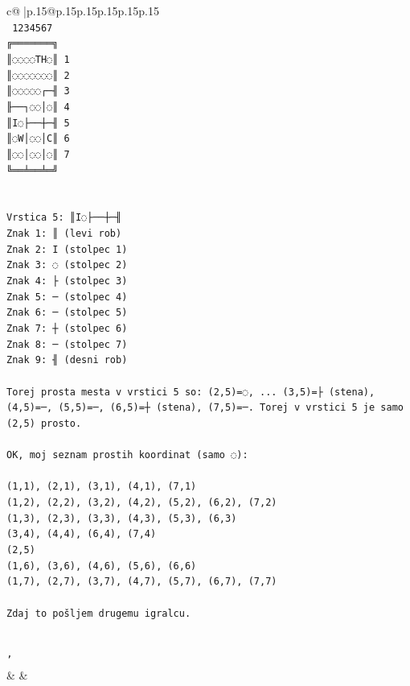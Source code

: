 \documentclass{article}
\begin{document}
{\begin{supertabular}{c@{$\;$}|p{.15\linewidth}@{}p{.15\linewidth}p{.15\linewidth}p{.15\linewidth}p{.15\linewidth}p{.15\linewidth}}
{{{\\ 
\texttt{ 1234567} \\
\texttt{╔═══════╗} \\
\texttt{║◌◌◌◌TH◌║ 1} \\
\texttt{║◌◌◌◌◌◌◌║ 2} \\
\texttt{║◌◌◌◌◌┌─╢ 3} \\
\texttt{╟──┐◌◌│◌║ 4} \\
\texttt{║I◌├──┼─╢ 5} \\
\texttt{║◌W│◌◌│C║ 6} \\
\texttt{║◌◌│◌◌│◌║ 7} \\
\texttt{╚══╧══╧═╝} \\
\\ 
\\ 
\texttt{Vrstica 5: ║I◌├──┼─╢} \\
\texttt{Znak 1: ║ (levi rob)} \\
\texttt{Znak 2: I (stolpec 1)} \\
\texttt{Znak 3: ◌ (stolpec 2)} \\
\texttt{Znak 4: ├ (stolpec 3)} \\
\texttt{Znak 5: ─ (stolpec 4)} \\
\texttt{Znak 6: ─ (stolpec 5)} \\
\texttt{Znak 7: ┼ (stolpec 6)} \\
\texttt{Znak 8: ─ (stolpec 7)} \\
\texttt{Znak 9: ╢ (desni rob)} \\
\\ 
\texttt{Torej prosta mesta v vrstici 5 so: (2,5)=◌, ... (3,5)=├ (stena), (4,5)=─, (5,5)=─, (6,5)=┼ (stena), (7,5)=─. Torej v vrstici 5 je samo (2,5) prosto.} \\
\\ 
\texttt{OK, moj seznam prostih koordinat (samo ◌):} \\
\\ 
\texttt{(1,1), (2,1), (3,1), (4,1), (7,1)} \\
\texttt{(1,2), (2,2), (3,2), (4,2), (5,2), (6,2), (7,2)} \\
\texttt{(1,3), (2,3), (3,3), (4,3), (5,3), (6,3)} \\
\texttt{(3,4), (4,4), (6,4), (7,4)} \\
\texttt{(2,5)} \\
\texttt{(1,6), (3,6), (4,6), (5,6), (6,6)} \\
\texttt{(1,7), (2,7), (3,7), (4,7), (5,7), (6,7), (7,7)} \\
\\ 
\texttt{Zdaj to pošljem drugemu igralcu.} \\
\\ 
\\ 
\texttt{'} \\
            }
        }
    }
    & & \\ \\


\end{supertabular}}
\end{document}
